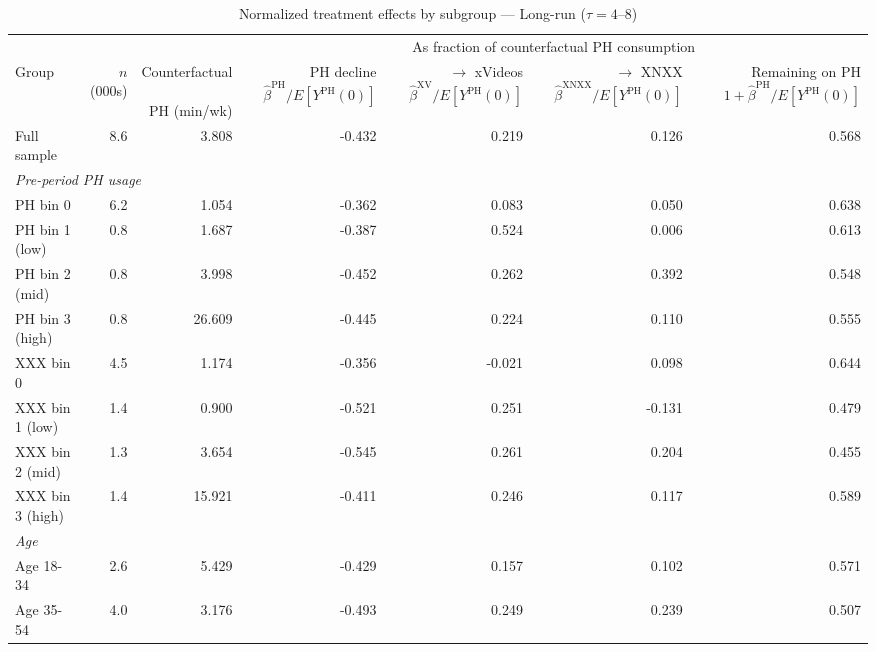 \begin{landscape}
\begin{table}[htbp]
\centering
\caption{Normalized treatment effects by subgroup --- Long-run ($\tau = 4$--$8$)}
\label{tab:normalized_het_lt}
\begin{tabular}{lrr rrrr}
\toprule
& & & \multicolumn{4}{c}{As fraction of counterfactual PH consumption} \\
\cmidrule(lr){4-7}
Group & $n$ (000s) & \shortstack{Counterfactual \\\\ PH (min/wk)} & \shortstack{PH decline \\\\ $\hat{\beta}^{\text{PH}}/E[Y^{\text{PH}}(0)]$} & \shortstack{$\to$ xVideos \\\\ $\hat{\beta}^{\text{XV}}/E[Y^{\text{PH}}(0)]$} & \shortstack{$\to$ XNXX \\\\ $\hat{\beta}^{\text{XNXX}}/E[Y^{\text{PH}}(0)]$} & \shortstack{Remaining on PH \\\\ $1 + \hat{\beta}^{\text{PH}}/E[Y^{\text{PH}}(0)]$}
\\ \midrule
Full sample & 8.6 & 3.808 & -0.432 & 0.219 & 0.126 & 0.568 \\
\midrule
\multicolumn{7}{l}{\textit{Pre-period PH usage}} \\
PH bin 0 & 6.2 & 1.054 & -0.362 & 0.083 & 0.050 & 0.638 \\
PH bin 1 (low) & 0.8 & 1.687 & -0.387 & 0.524 & 0.006 & 0.613 \\
PH bin 2 (mid) & 0.8 & 3.998 & -0.452 & 0.262 & 0.392 & 0.548 \\
PH bin 3 (high) & 0.8 & 26.609 & -0.445 & 0.224 & 0.110 & 0.555 \\
XXX bin 0 & 4.5 & 1.174 & -0.356 & -0.021 & 0.098 & 0.644 \\
XXX bin 1 (low) & 1.4 & 0.900 & -0.521 & 0.251 & -0.131 & 0.479 \\
XXX bin 2 (mid) & 1.3 & 3.654 & -0.545 & 0.261 & 0.204 & 0.455 \\
XXX bin 3 (high) & 1.4 & 15.921 & -0.411 & 0.246 & 0.117 & 0.589 \\
\midrule
\multicolumn{7}{l}{\textit{Age}} \\
Age 18-34 & 2.6 & 5.429 & -0.429 & 0.157 & 0.102 & 0.571 \\
Age 35-54 & 4.0 & 3.176 & -0.493 & 0.249 & 0.239 & 0.507 \\

\end{tabular}
\end{table}
\end{landscape}
